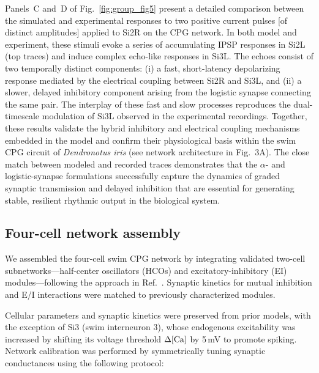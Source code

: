 \documentclass[nofootinbib,aip,amsmath,amssymb,reprint,twocolumn,10pt]{revtex4-2}
\begin{document}
Panels~C and~D of Fig.~\ref{fig:group_fig5} present a detailed comparison between the simulated and experimental responses to two positive current pulses [of distinct amplitudes] applied to Si2R on the CPG network. In both model and experiment, these stimuli evoke a series of accumulating IPSP responses in Si2L (top traces) and induce complex echo-like responses in Si3L. The echoes consist of two temporally distinct components: (i) a fast, short-latency depolarizing response mediated by the electrical  coupling between Si2R and Si3L, and (ii) a slower, delayed inhibitory component arising from the logistic synapse connecting the same pair. The interplay of these fast and slow processes reproduces the dual-timescale modulation of Si3L observed in the experimental recordings.
Together, these results validate the hybrid inhibitory and electrical coupling mechanisms embedded in the model and confirm their physiological basis within the swim CPG circuit of {\em \textit{Dendronotus iris}} (see network architecture in Fig.~3A). The close match between modeled and recorded traces demonstrates that the $\alpha$- and logistic-synapse formulations successfully capture the dynamics of graded synaptic transmission and delayed inhibition that are essential for generating stable, resilient rhythmic output in the biological system.

\subsection{Four-cell network assembly}

We assembled the four-cell swim CPG network by integrating validated two-cell subnetworks---half-center oscillators (HCOs) and excitatory-inhibitory (EI) modules---following the approach in Ref.~\cite{scully2024pairing}. Synaptic kinetics for mutual inhibition and E/I interactions were matched to previously characterized modules.

Cellular parameters and synaptic kinetics were preserved from prior models, with the exception of Si3 (swim interneuron 3), whose endogenous excitability was increased by shifting its voltage threshold $\Delta [\rm Ca]$ by 5\,mV to promote spiking. Network calibration was performed by symmetrically tuning synaptic conductances using the following protocol:
\end{document}
